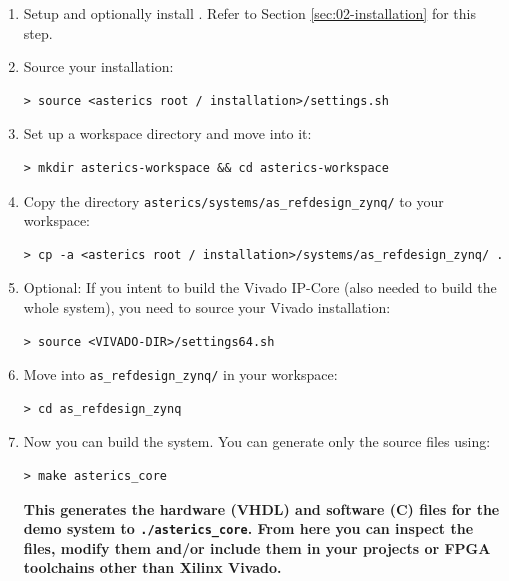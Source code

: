 \begin{enumerate}

\item Setup and optionally install \asterics. Refer to Section \ref{sec:02-installation} for this step.
\item Source your \asterics installation:
	\begin{lstlisting}[style=Shell]
 > source <asterics root / installation>/settings.sh
  \end{lstlisting}
\item Set up a workspace directory and move into it:
  \begin{lstlisting}[style=Shell]
 > mkdir asterics-workspace && cd asterics-workspace
  \end{lstlisting}
\item Copy the directory \texttt{asterics/systems/as\_refdesign\_zynq/} to your workspace:
  \begin{lstlisting}[style=Shell]
 > cp -a <asterics root / installation>/systems/as_refdesign_zynq/ .
  \end{lstlisting}
\item Optional: If you intent to build the Vivado IP-Core (also needed to build the whole system), you need to source your Vivado installation:
  \begin{lstlisting}[style=Shell]
 > source <VIVADO-DIR>/settings64.sh
  \end{lstlisting}
\item Move into \texttt{as\_refdesign\_zynq/} in your workspace:
  \begin{lstlisting}[style=Shell]
 > cd as_refdesign_zynq
  \end{lstlisting}
\item Now you can build the system. You can generate only the \asterics source files using:
  \begin{lstlisting}[style=Shell]
 > make asterics_core
  \end{lstlisting}
  \textbf{This generates the \asterics hardware (VHDL) and software (C) files for the demo system to \texttt{./asterics\_core}.
  From here you can inspect the files, modify them and/or include them in your projects or FPGA toolchains other than Xilinx Vivado.}


\end{enumerate}
